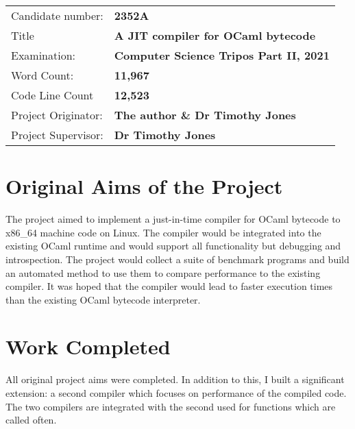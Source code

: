  {\large

  \begin{tabular}{ll}
      Candidate number:   & \textbf{2352A}                                 \\
      Title               & \textbf{A JIT compiler for OCaml bytecode}     \\
      Examination:        & \textbf{Computer Science Tripos Part II, 2021} \\
      Word Count:         & \textbf{11,967\footnotemark}                   \\
      Code Line Count     & \textbf{12,523\footnotemark}                   \\
      Project Originator: & \textbf{The author \& Dr Timothy Jones}        \\
      Project Supervisor: & \textbf{Dr Timothy Jones}                      \\
  \end{tabular}
 }

\section*{Original Aims of the Project}

The project aimed to implement a just-in-time compiler for OCaml bytecode to x86\_64 machine code
on
Linux. The compiler would be integrated into the existing OCaml runtime and would support all
functionality but debugging and introspection. The project would collect a suite of benchmark
programs
and build an automated method to use them to compare performance to the existing compiler. It was
hoped
that the compiler would lead to faster execution times than the existing OCaml bytecode
interpreter.

\section*{Work Completed}

All original project aims were completed. In addition to this, I built a significant
extension: a second compiler which focuses on performance of the compiled code. The
two compilers are integrated with the second used for functions which are called often.

